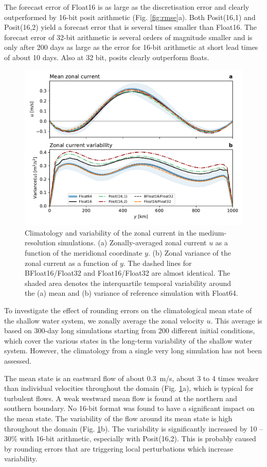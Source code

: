 The forecast error of Float16 is as large as the discretisation error and
clearly outperformed by 16-bit posit arithmetic (Fig. \ref{fig:rmse}a).
Both Posit(16,1) and Posit(16,2) yield a forecast error that is several times
smaller than Float16. The forecast error of 32-bit arithmetic is several orders
of magnitude smaller and is only after 200 days as large as the error for 16-bit
arithmetic at short lead times of about 10 days. Also at 32 bit, posits clearly
outperform floats.

\begin{figure}
\includegraphics[width=1\textwidth]{Figures/swm/meanvar_u.pdf}
\caption{Climatology and variability of the zonal current in the medium-resolution
simulations. (a) Zonally-averaged zonal current $u$ as a function of the meridional
coordinate $y$. (b) Zonal variance of the zonal current as a function of $y$.
The dashed lines for BFloat16/Float32 and Float16/Float32 are almost identical.
The shaded area denotes the interquartile temporal variability around the (a) mean and
(b) variance of reference simulation with Float64.}
\label{fig:mean}
\end{figure}

To investigate the effect of rounding errors on the climatological mean state of
the shallow water system, we zonally average the zonal velocity $u$. This average
is based on 300-day long simulations starting from 200 different initial conditions,
which cover the various states in the long-term variability of the shallow water system.
However, the climatology from a single very long simulation has not been assessed.

The mean state is an eastward flow of about 0.3~m/s, about 3 to 4 times weaker than
individual velocities throughout the domain (Fig. \ref{fig:mean}a), which is typical
for turbulent flows. A weak westward mean flow is found at the northern and
southern boundary. No 16-bit format was found to have a significant impact on
the mean state. The variability of the flow around its mean state is high
throughout the domain (Fig. \ref{fig:mean}b). The variability is significantly
increased by 10 -- 30\% with 16-bit arithmetic, especially with Posit(16,2).
This is probably caused by rounding errors that are triggering local
perturbations which increase variability.

